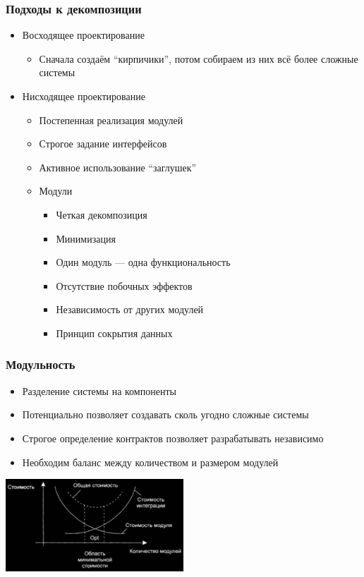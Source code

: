 \documentclass{../cscslides}
\begin{document}
    \begin{frame}
        \frametitle{Подходы к декомпозиции}
        \begin{itemize}
            \item Восходящее проектирование
            \begin{itemize}
                \item Сначала создаём ``кирпичики'', потом собираем из них всё более сложные системы
            \end{itemize}
            \item Нисходящее проектирование
            \begin{itemize}
                \item Постепенная реализация модулей
                \item Строгое задание интерфейсов
                \item Активное использование ``заглушек''
                \item Модули
                \begin{itemize}
                    \item Четкая декомпозиция
                    \item Минимизация
                    \item Один модуль --- одна функциональность
                    \item Отсутствие побочных эффектов
                    \item Независимость от других модулей
                    \item Принцип сокрытия данных
                \end{itemize}
            \end{itemize}
        \end{itemize}
    \end{frame}
    
    \begin{frame}
        \frametitle{Модульность}
        \begin{itemize}
            \item Разделение системы на компоненты
            \item Потенциально позволяет создавать сколь угодно сложные системы
            \item Строгое определение контрактов позволяет разрабатывать независимо
            \item Необходим баланс между количеством и размером модулей
        \end{itemize}
        \vskip 1cm
        \begin{center}
            \includegraphics[width=0.5\textwidth]{modulesCostBlack.png}
        \end{center}
    \end{frame}
\end{document}
